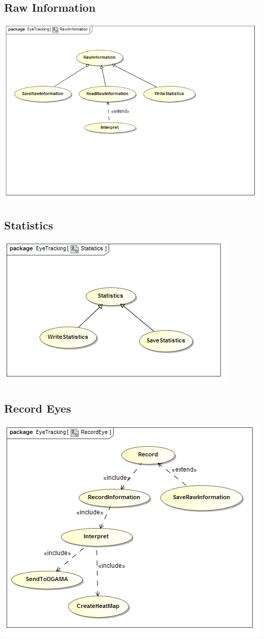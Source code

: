 		
\subsection{Raw Information}
	\includegraphics[scale=0.5]{Diagrams/Use_Case_Diagram__RawInformation.png}
	
	
\subsection{Statistics}
	\includegraphics[scale=0.5]{Diagrams/Use_Case_Diagram__Statistics.png}
	
	
\subsection{Record Eyes}
	\includegraphics[scale=0.5]{Diagrams/Use_Case_Diagram__RecordEye.png}



